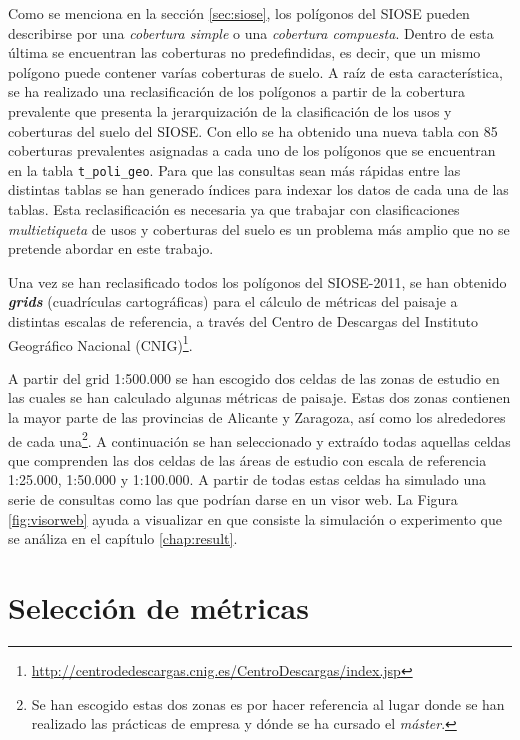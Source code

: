 Como se menciona en la sección \ref{sec:siose}, los polígonos del SIOSE pueden describirse por una \textit{cobertura simple} o una \textit{cobertura compuesta}. Dentro de esta última se encuentran las coberturas no predefindidas, es decir, que un mismo polígono puede contener varías coberturas de suelo. A raíz de esta característica, se ha realizado una reclasificación de los polígonos a partir de la cobertura prevalente que presenta la jerarquización de la clasificación de los usos y coberturas del suelo del SIOSE. Con ello se ha obtenido una nueva tabla con 85 coberturas prevalentes asignadas a cada uno de los polígonos que se encuentran en la tabla \texttt{t\_poli\_geo}. Para que las consultas sean más rápidas entre las distintas tablas se han generado índices para indexar los datos de cada una de las tablas. Esta reclasificación es necesaria ya que trabajar con clasificaciones \textit{multietiqueta} de usos y coberturas del suelo es un problema más amplio que no se pretende abordar en este trabajo.

Una vez se han reclasificado todos los polígonos del SIOSE-2011, se han obtenido \textbf{\textit{grids}} (cuadrículas cartográficas) para el cálculo de métricas del paisaje a distintas escalas de referencia, a través del Centro de Descargas del Instituto Geográfico Nacional (CNIG)\footnote{\url{http://centrodedescargas.cnig.es/CentroDescargas/index.jsp}}.

A partir del grid 1:500.000 se han escogido dos celdas de las zonas de estudio en las cuales se han calculado algunas métricas de paisaje. Estas dos zonas contienen la mayor parte de las provincias de Alicante y Zaragoza, así como los alrededores de cada una\footnote{Se han escogido estas dos zonas es por hacer referencia al lugar donde se han realizado las prácticas de empresa y dónde se ha cursado el \textit{máster}.}. A continuación se han seleccionado y extraído todas aquellas celdas que comprenden las dos celdas de las áreas de estudio con escala de referencia 1:25.000, 1:50.000 y 1:100.000. A partir de todas estas celdas ha simulado una serie de consultas como las que podrían darse en un visor web. La Figura \ref{fig:visorweb} ayuda a visualizar en que consiste la simulación o experimento que se análiza en el capítulo \ref{chap:result}.


\section{Selección de métricas}\label{sec:metricas}

